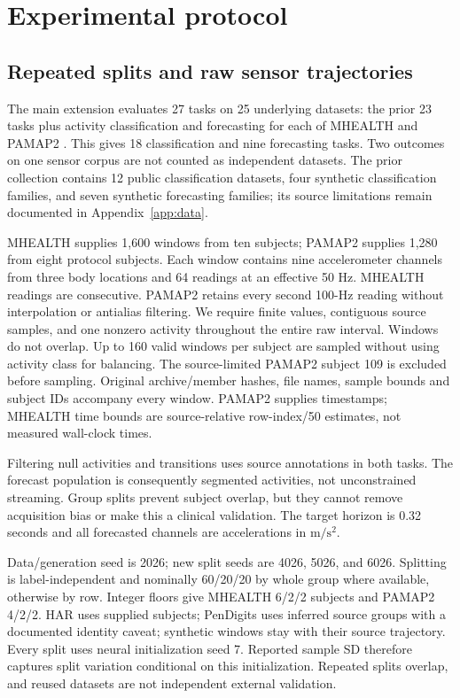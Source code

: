 \documentclass{article}
\begin{document}
\section{Experimental protocol}
\subsection{Repeated splits and raw sensor trajectories}
The main extension evaluates 27 tasks on 25 underlying datasets: the prior 23 tasks plus activity classification and forecasting for each of MHEALTH \citep{banos2014mhealth} and PAMAP2 \citep{reiss2012pamap}. This gives 18 classification and nine forecasting tasks. Two outcomes on one sensor corpus are not counted as independent datasets. The prior collection contains 12 public classification datasets, four synthetic classification families, and seven synthetic forecasting families; its source limitations remain documented in Appendix~\ref{app:data}.

MHEALTH supplies 1,600 windows from ten subjects; PAMAP2 supplies 1,280 from eight protocol subjects. Each window contains nine accelerometer channels from three body locations and 64 readings at an effective 50 Hz. MHEALTH readings are consecutive. PAMAP2 retains every second 100-Hz reading without interpolation or antialias filtering. We require finite values, contiguous source samples, and one nonzero activity throughout the entire raw interval. Windows do not overlap. Up to 160 valid windows per subject are sampled without using activity class for balancing. The source-limited PAMAP2 subject 109 is excluded before sampling. Original archive/member hashes, file names, sample bounds and subject IDs accompany every window. PAMAP2 supplies timestamps; MHEALTH time bounds are source-relative row-index/50 estimates, not measured wall-clock times.

Filtering null activities and transitions uses source annotations in both tasks. The forecast population is consequently segmented activities, not unconstrained streaming. Group splits prevent subject overlap, but they cannot remove acquisition bias or make this a clinical validation. The target horizon is 0.32 seconds and all forecasted channels are accelerations in $\mathrm{m/s^2}$.

Data/generation seed is 2026; new split seeds are 4026, 5026, and 6026. Splitting is label-independent and nominally 60/20/20 by whole group where available, otherwise by row. Integer floors give MHEALTH 6/2/2 subjects and PAMAP2 4/2/2. HAR uses supplied subjects; PenDigits uses inferred source groups with a documented identity caveat; synthetic windows stay with their source trajectory. Every split uses neural initialization seed 7. Reported sample SD therefore captures split variation conditional on this initialization. Repeated splits overlap, and reused datasets are not independent external validation.
\end{document}
